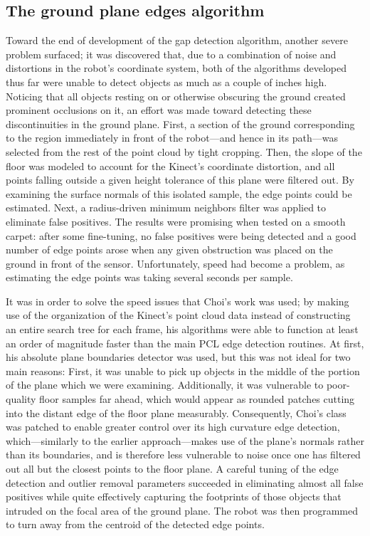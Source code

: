 \documentclass[12pt]{report}
\begin{document}
\subsection[Ground plane edges]{The ground plane edges algorithm}
Toward the end of development of the gap detection algorithm, another severe problem surfaced; it was discovered that, due to a combination of noise and distortions in the robot's coordinate system, both of the algorithms developed thus far were unable to detect objects as much as a couple of inches high.  Noticing that all objects resting on or otherwise obscuring the ground created prominent occlusions on it, an effort was made toward detecting these discontinuities in the ground plane.  First, a section of the ground corresponding to the region immediately in front of the robot---and hence in its path---was selected from the rest of the point cloud by tight cropping.  Then, the slope of the floor was modeled to account for the Kinect's coordinate distortion, and all points falling outside a given height tolerance of this plane were filtered out.  By examining the surface normals of this isolated sample, the edge points could be estimated.  Next, a radius-driven minimum neighbors filter was applied to eliminate false positives.  The results were promising when tested on a smooth carpet: after some fine-tuning, no false positives were being detected and a good number of edge points arose when any given obstruction was placed on the ground in front of the sensor.  Unfortunately, speed had become a problem, as estimating the edge points was taking several seconds per sample.

It was in order to solve the speed issues that Choi's work was used; by making use of the organization of the Kinect's point cloud data instead of constructing an entire search tree for each frame, his algorithms were able to function at least an order of magnitude faster than the main PCL edge detection routines.  At first, his absolute plane boundaries detector was used, but this was not ideal for two main reasons:  First, it was unable to pick up objects in the middle of the portion of the plane which we were examining.  Additionally, it was vulnerable to poor-quality floor samples far ahead, which would appear as rounded patches cutting into the distant edge of the floor plane measurably.  Consequently, Choi's class was patched to enable greater control over its high curvature edge detection, which---similarly to the earlier approach---makes use of the plane's normals rather than its boundaries, and is therefore less vulnerable to noise once one has filtered out all but the closest points to the floor plane.  A careful tuning of the edge detection and outlier removal parameters succeeded in eliminating almost all false positives while quite effectively capturing the footprints of those objects that intruded on the focal area of the ground plane.  The robot was then programmed to turn away from the centroid of the detected edge points.
\end{document}
